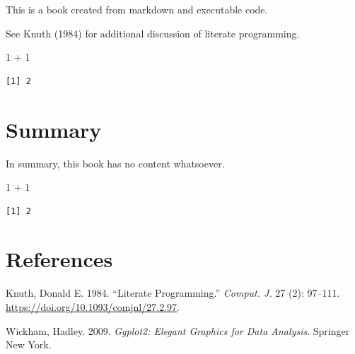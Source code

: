 \documentclass[
  letterpaper,
  DIV=11,
  numbers=noendperiod]{scrreprt}
\newenvironment{Shaded}{\begin{snugshade}}{\end{snugshade}}
\newcommand{\DecValTok}[1]{\textcolor[rgb]{0.68,0.00,0.00}{#1}}
\newcommand{\SpecialCharTok}[1]{\textcolor[rgb]{0.37,0.37,0.37}{#1}}
\newlength{\cslhangindent}
\newenvironment{CSLReferences}[2] %
 {\begin{list}{}{%
  \setlength{\itemindent}{0pt}
  \setlength{\leftmargin}{0pt}
  \setlength{\parsep}{0pt}
  \ifodd #1
   \setlength{\leftmargin}{\cslhangindent}
   \setlength{\itemindent}{-1\cslhangindent}
  \fi
  \setlength{\itemsep}{#2\baselineskip}}}
 {\end{list}}
\begin{document}
This is a book created from markdown and executable code.

See Knuth (1984) for additional discussion of literate programming.

\begin{Shaded}
\begin{Highlighting}[]
\DecValTok{1} \SpecialCharTok{+} \DecValTok{1}
\end{Highlighting}
\end{Shaded}

\begin{verbatim}
[1] 2
\end{verbatim}


\chapter{Summary}\label{summary}

In summary, this book has no content whatsoever.

\begin{Shaded}
\begin{Highlighting}[]
\DecValTok{1} \SpecialCharTok{+} \DecValTok{1}
\end{Highlighting}
\end{Shaded}

\begin{verbatim}
[1] 2
\end{verbatim}


\chapter*{References}\label{references}


\label{refs}
\begin{CSLReferences}{1}{0}
Knuth, Donald E. 1984. {``Literate Programming.''} \emph{Comput. J.} 27
(2): 97--111. \url{https://doi.org/10.1093/comjnl/27.2.97}.

Wickham, Hadley. 2009. \emph{Ggplot2: Elegant Graphics for Data
Analysis}. Springer New York.

\end{CSLReferences}
\end{document}
